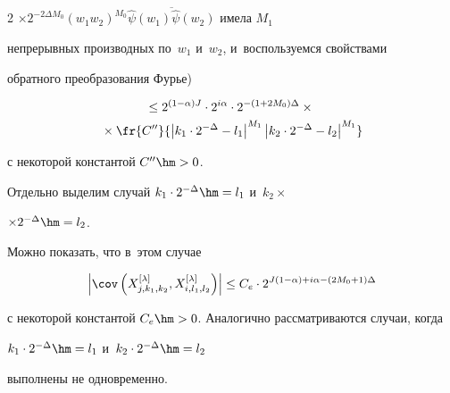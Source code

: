 \begin{multicols}{2}
$\times 2^{-2\Delta M_0}(w_1 w_2)^{M_0}


\overline{ \widehat{\psi}(w_1) \widehat{\psi}(w_2)}$ имела $M_1$


непрерывных производных по~$w_1$ и~$w_2$, и~воспользуемся свойствами


обратного преобразования Фурье)





\noindent


\begin{multline*}


\leq 2^{(1-\alpha)J} \cdot 2^{i\alpha}\cdot 2^{-(1+2M_0)\Delta}\times{}\\


{}\times


\fr{C''}{\left\vert k_1\cdot 2^{-\Delta} - l_1\right\vert^{M_1}


\left\vert k_2\cdot 2^{-\Delta} - l_2\right\vert^{M_1}}


\end{multline*}


с некоторой константой $C''\hm>0$.








Отдельно выделим случай $k_1 \cdot2^{-\Delta}\hm=l_1$ и~$k_2 \times$\linebreak


$\times 2^{-\Delta}\hm=l_2$.


Можно показать, что в~этом случае


\begin{equation*}


\left\vert\cov\left(X_{j,k_1,k_2}^{[\lambda]},X_{i,l_1,l_2}^{[\lambda]}\right)\right\vert


\leq C_e\cdot 2^{J(1-\alpha) + i\alpha -(2M_0+1)\Delta}


\end{equation*}











\noindent


с некоторой константой $C_e\hm>0$. Аналогично рассматриваются случаи, когда


$k_1 \cdot2^{-\Delta}\hm=l_1$ и~$k_2 \cdot2^{-\Delta}\hm=l_2$ 


выполнены не одновременно.



\end{multicols}
